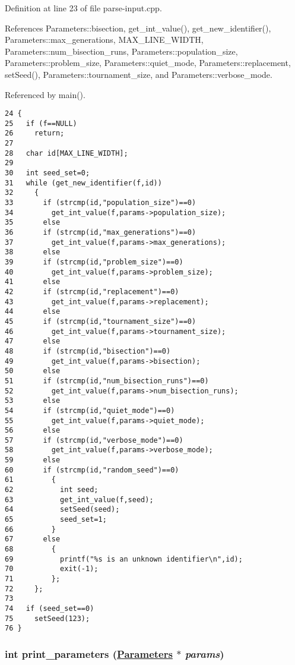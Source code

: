 Definition at line 23 of file parse-input.cpp.

References Parameters::bisection, get\_\-int\_\-value(), get\_\-new\_\-identifier(), Parameters::max\_\-generations, MAX\_\-LINE\_\-WIDTH, Parameters::num\_\-bisection\_\-runs, Parameters::population\_\-size, Parameters::problem\_\-size, Parameters::quiet\_\-mode, Parameters::replacement, set\-Seed(), Parameters::tournament\_\-size, and Parameters::verbose\_\-mode.

Referenced by main().

\begin{Code}\begin{verbatim}24 {
25   if (f==NULL)
26     return;
27 
28   char id[MAX_LINE_WIDTH];
29 
30   int seed_set=0;
31   while (get_new_identifier(f,id))
32     {
33       if (strcmp(id,"population_size")==0)
34         get_int_value(f,params->population_size);
35       else
36       if (strcmp(id,"max_generations")==0)
37         get_int_value(f,params->max_generations);
38       else
39       if (strcmp(id,"problem_size")==0)
40         get_int_value(f,params->problem_size);
41       else
42       if (strcmp(id,"replacement")==0)
43         get_int_value(f,params->replacement);
44       else
45       if (strcmp(id,"tournament_size")==0)
46         get_int_value(f,params->tournament_size);
47       else
48       if (strcmp(id,"bisection")==0)
49         get_int_value(f,params->bisection);
50       else
51       if (strcmp(id,"num_bisection_runs")==0)
52         get_int_value(f,params->num_bisection_runs);
53       else
54       if (strcmp(id,"quiet_mode")==0)
55         get_int_value(f,params->quiet_mode);
56       else
57       if (strcmp(id,"verbose_mode")==0)
58         get_int_value(f,params->verbose_mode);
59       else
60       if (strcmp(id,"random_seed")==0)
61         {
62           int seed;
63           get_int_value(f,seed);
64           setSeed(seed);
65           seed_set=1;
66         }
67       else
68         {
69           printf("%s is an unknown identifier\n",id);
70           exit(-1);
71         };
72     };
73   
74   if (seed_set==0)
75     setSeed(123);
76 }
\end{verbatim}\end{Code}


\hypertarget{parse-input_8cpp_9d6eb3d840afb4c96f4d0e52e61c3bf7}{
\subsubsection[print\_\-parameters]{\setlength{\rightskip}{0pt plus 5cm}int print\_\-parameters (\hyperlink{struct_parameters}{Parameters} $\ast$ {\em params})}}
\label{parse-input_8cpp_9d6eb3d840afb4c96f4d0e52e61c3bf7}


